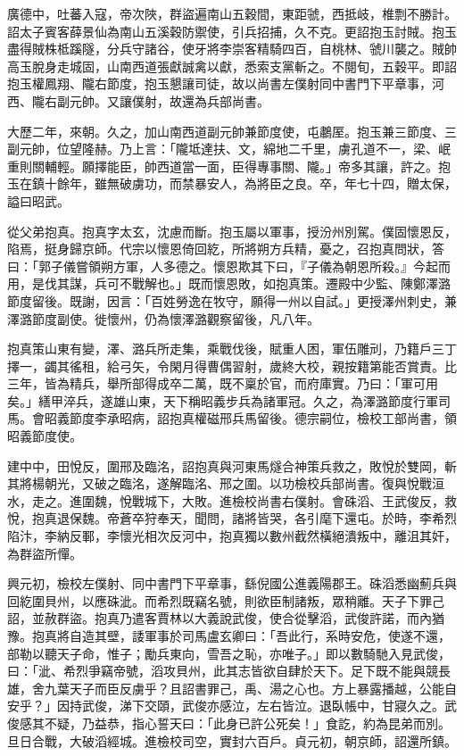 \begin{pinyinscope}
 廣德中，吐蕃入寇，帝次陜，群盜遍南山五穀間，東距虢，西抵岐，椎剽不勝計。詔太子賓客薛景仙為南山五溪穀防禦使，引兵招捕，久不克。更詔抱玉討賊。抱玉盡得賊株柢蹊隧，分兵守諸谷，使牙將李崇客精騎四百，自桃林、虢川襲之。賊帥高玉脫身走城固，山南西道張獻誠禽以獻，悉索支黨斬之。不閱旬，五穀平。即詔抱玉權鳳翔、隴右節度，抱玉懇讓司徒，故以尚書左僕射同中書門下平章事，河西、隴右副元帥。又讓僕射，故還為兵部尚書。



 大歷二年，來朝。久之，加山南西道副元帥兼節度使，屯鷫厔。抱玉兼三節度、三副元帥，位望隆赫。乃上言：「隴坻達扶、文，綿地二千里，虜孔道不一，梁、岷重則關輔輕。願擇能臣，帥西道當一面，臣得專事關、隴。」帝多其讓，許之。抱玉在鎮十餘年，雖無破虜功，而禁暴安人，為將臣之良。卒，年七十四，贈太保，謚曰昭武。



 從父弟抱真。抱真字太玄，沈慮而斷。抱玉屬以軍事，授汾州別駕。僕固懷恩反，陷焉，挺身歸京師。代宗以懷恩倚回紇，所將朔方兵精，憂之，召抱真問狀，答曰：「郭子儀嘗領朔方軍，人多德之。懷恩欺其下曰，『子儀為朝恩所殺。』今起而用，是伐其謀，兵可不戰解也。」既而懷恩敗，如抱真策。遷殿中少監、陳鄭澤潞節度留後。既謝，因言：「百姓勞逸在牧守，願得一州以自試。」更授澤州刺史，兼澤潞節度副使。徙懷州，仍為懷澤潞觀察留後，凡八年。



 抱真策山東有變，澤、潞兵所走集，乘戰伐後，賦重人困，軍伍雕刓，乃籍戶三丁擇一，蠲其徭租，給弓矢，令閑月得曹偶習射，歲終大校，親按籍第能否賞責。比三年，皆為精兵，舉所部得成卒二萬，既不稟於官，而府庫實。乃曰：「軍可用矣。」繕甲淬兵，遂雄山東，天下稱昭義步兵為諸軍冠。久之，為澤潞節度行軍司馬。會昭義節度李承昭病，詔抱真權磁邢兵馬留後。德宗嗣位，檢校工部尚書，領昭義節度使。



 建中中，田悅反，圍邢及臨洺，詔抱真與河東馬燧合神策兵救之，敗悅於雙岡，斬其將楊朝光，又破之臨洺，遂解臨洺、邢之圍。以功檢校兵部尚書。復與悅戰洹水，走之。進圍魏，悅戰城下，大敗。進檢校尚書右僕射。會硃滔、王武俊反，救悅，抱真退保魏。帝蒼卒狩奉天，聞問，諸將皆哭，各引麾下還屯。於時，李希烈陷汴，李納反鄆，李懷光相次反河中，抱真獨以數州截然橫絕潰叛中，離沮其奸，為群盜所憚。



 興元初，檢校左僕射、同中書門下平章事，繇倪國公進義陽郡王。硃滔悉幽薊兵與回紇圍貝州，以應硃泚。而希烈既竊名號，則欲臣制諸叛，眾稍離。天子下罪己詔，並赦群盜。抱真乃遣客賈林以大義說武俊，使合從擊滔，武俊許諾，而內猶豫。抱真將自造其壁，諉軍事於司馬盧玄卿曰：「吾此行，系時安危，使遂不還，部勒以聽天子命，惟子；勵兵東向，雪吾之恥，亦唯子。」即以數騎馳入見武俊，曰：「泚、希烈爭竊帝號，滔攻貝州，此其志皆欲自肆於天下。足下既不能與競長雄，舍九葉天子而臣反虜乎？且詔書罪己，禹、湯之心也。方上暴露播越，公能自安乎？」因持武俊，涕下交頤，武俊亦感泣，左右皆泣。退臥帳中，甘寢久之。武俊感其不疑，乃益恭，指心誓天曰：「此身已許公死矣！」食訖，約為昆弟而別。旦日合戰，大破滔經城。進檢校司空，實封六百戶。貞元初，朝京師，詔還所鎮。




\end{pinyinscope}
